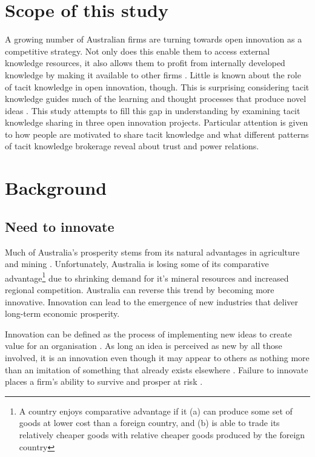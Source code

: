 
\section{Scope of this study}

A growing number of Australian firms are turning towards open innovation as a competitive strategy. Not only does this enable them to access external knowledge resources, it also allows them to profit from internally developed knowledge by making it available to other firms \citep{chesbrough2003open}. Little is known about the role of tacit knowledge in open innovation, though. This is surprising considering tacit knowledge guides much of the learning and thought processes that produce novel ideas \citep{leonard1998role}. This study attempts to fill this gap in understanding by examining tacit knowledge sharing in three open innovation projects. Particular attention is given to how people are motivated to share tacit knowledge and what different patterns of tacit knowledge brokerage reveal about trust and power relations. \medskip

\section{Background}

\subsection{Need to innovate}

Much of Australia's prosperity stems from its natural advantages in agriculture and mining \citep{leung2016view}. Unfortunately, Australia is losing some of its comparative advantage\footnote{A country enjoys comparative advantage if it (a) can produce some set of goods at lower cost than a foreign country, and (b) is able to trade its relatively cheaper goods with relative cheaper goods produced by the foreign country} due to shrinking demand for it's mineral resources and increased regional competition. Australia can reverse this trend by becoming more innovative. Innovation can lead to the emergence of new industries that deliver long-term economic prosperity. \medskip

Innovation can be defined as the process of implementing new ideas to create value for an organisation \citep{schumpeter1950capitalism}. As long an idea is perceived as new by all those involved, it is an innovation even though it may appear to others as nothing more than an imitation of something that already exists elsewhere \citep{van1986central}. Failure to innovate places a firm’s ability to survive and prosper at risk \citep{bessant2005managing}. \medskip

